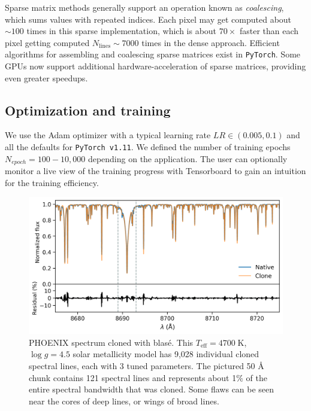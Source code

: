 \documentclass[twocolumn]{aastex631}
\begin{document}
Sparse matrix methods generally support an operation known as \emph{coalescing}, which sums values with repeated indices. Each pixel may get computed about $\sim100$ times in this sparse implementation, which is about $70\times$ faster than each pixel getting computed $N_\mathrm{lines}\sim7000$ times in the dense approach.  Efficient algorithms for assembling and coalescing sparse matrices exist in \texttt{PyTorch}.  Some GPUs now support additional hardware-acceleration of sparse matrices, providing even greater speedups.



\subsection{Optimization and training}

We use the Adam optimizer \citep{2014arXiv1412.6980K} with a typical learning rate $LR\in (0.005, 0.1)$ and all the defaults for \texttt{PyTorch v1.11}.  We defined the number of training epochs $N_{epoch}=100-10,000$ depending on the application. The user can optionally monitor a live view of the training progress with Tensorboard \citep{tensorflow2015-whitepaper} to gain an intuition for the training efficiency.


\begin{figure}[hbt!]
    \centering
    \includegraphics[width=1.0\columnwidth]{blase_clone_demo.png}
    \caption{PHOENIX spectrum cloned with blas\'e.  This $T_{\mathrm{eff}}=4700\;$K,  $\log{g}=4.5$ solar metallicity model has 9,028 individual cloned spectral lines, each with 3 tuned parameters.  The pictured 50 \AA~ chunk contains 121 spectral lines and represents about 1$\%$ of the entire spectral bandwidth that was cloned.  Some flaws can be seen near the cores of deep lines, or wings of broad lines.}
    \label{fig_cloned_spectrum_demo}
\end{figure}
\end{document}
